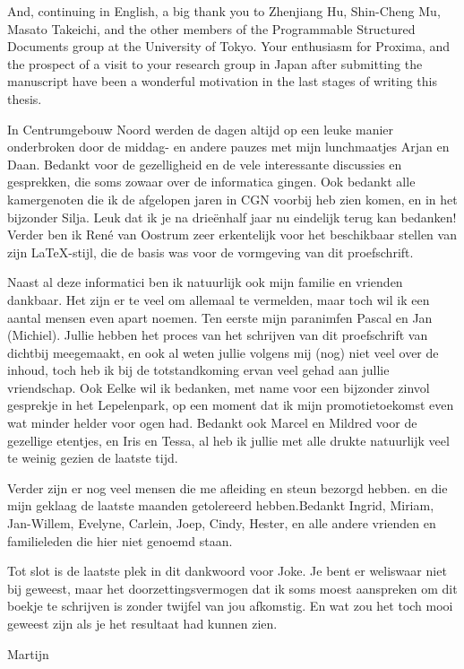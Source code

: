 And, continuing in English, a big thank you to Zhenjiang Hu, Shin-Cheng Mu, Masato Takeichi, and the other members of the Programmable Structured Documents group at the University of Tokyo. Your enthusiasm for Proxima, and the prospect of a visit to your research group in Japan after submitting the manuscript have been a wonderful motivation in the last stages of writing this thesis.


In Centrumgebouw Noord werden de dagen altijd op een leuke manier onderbroken door de middag- en andere pauzes met mijn lunchmaatjes Arjan en Daan. Bedankt voor de gezelligheid en de vele interessante discussies en gesprekken, die soms zowaar over de informatica gingen. Ook bedankt alle kamergenoten die ik de afgelopen jaren in CGN voorbij heb zien komen, en in het bijzonder Silja. Leuk dat ik je na drie\"enhalf jaar nu eindelijk terug kan bedanken! Verder ben ik Ren\'e van Oostrum zeer erkentelijk voor het beschikbaar stellen van zijn \LaTeX-stijl, die de basis was voor de vormgeving van dit proefschrift.

Naast al deze informatici ben ik natuurlijk ook mijn familie en vrienden dankbaar. Het zijn er te veel om allemaal te vermelden, maar toch wil ik een aantal mensen even apart noemen. Ten eerste mijn paranimfen Pascal en Jan (Michiel). Jullie hebben het proces van het schrijven van dit proefschrift van dichtbij meegemaakt, en ook al weten jullie volgens mij (nog) niet veel over de inhoud, toch heb ik bij de totstandkoming ervan veel gehad aan jullie vriendschap.  Ook Eelke wil ik bedanken, met name voor een bijzonder zinvol gesprekje in het Lepelenpark, op een moment dat ik mijn promotietoekomst even wat minder helder voor ogen had. Bedankt ook Marcel en Mildred voor de gezellige etentjes, en Iris en Tessa, al heb ik jullie met alle drukte natuurlijk veel te weinig gezien de laatste tijd.

Verder zijn er nog veel mensen die me afleiding en steun bezorgd hebben. \bc en die mijn geklaag de laatste maanden getolereerd hebben.\ec Bedankt Ingrid, Miriam, Jan-Willem, Evelyne, Carlein, Joep, Cindy, Hester, en alle andere vrienden en familieleden die  hier niet genoemd staan. 





Tot slot is de laatste plek in dit dankwoord voor Joke. Je bent er weliswaar niet bij geweest, maar het doorzettingsvermogen dat ik soms moest aanspreken om dit boekje te schrijven is zonder twijfel van jou afkomstig. En wat zou het \bc toch \ec mooi geweest zijn als je het resultaat had kunnen zien.

\bigskip
Martijn
